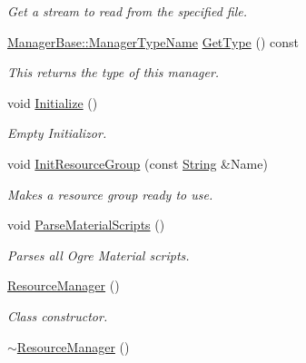 \begin{DoxyCompactItemize}
\begin{DoxyCompactList}\small\item\em Get a stream to read from the specified file. \item\end{DoxyCompactList}\item 
\hyperlink{classphys_1_1ManagerBase_aaa6ccddf23892eaccb898529414f80a5}{ManagerBase::ManagerTypeName} \hyperlink{classphys_1_1ResourceManager_a9e5468e5428f5c108c7b3c01e94eba46}{GetType} () const 
\begin{DoxyCompactList}\small\item\em This returns the type of this manager. \item\end{DoxyCompactList}\item 
void \hyperlink{classphys_1_1ResourceManager_a9be3250f1f1153c9e079f82736eb00a8}{Initialize} ()
\begin{DoxyCompactList}\small\item\em Empty Initializor. \item\end{DoxyCompactList}\item 
void \hyperlink{classphys_1_1ResourceManager_aa2f44129dfc3dc0b0ee332a2bba6078d}{InitResourceGroup} (const \hyperlink{namespacephys_aa03900411993de7fbfec4789bc1d392e}{String} \&Name)
\begin{DoxyCompactList}\small\item\em Makes a resource group ready to use. \item\end{DoxyCompactList}\item 
\hypertarget{classphys_1_1ResourceManager_a348f333ffd9638decd144bf9d65ca05d}{
void \hyperlink{classphys_1_1ResourceManager_a348f333ffd9638decd144bf9d65ca05d}{ParseMaterialScripts} ()}
\label{classphys_1_1ResourceManager_a348f333ffd9638decd144bf9d65ca05d}

\begin{DoxyCompactList}\small\item\em Parses all Ogre Material scripts. \item\end{DoxyCompactList}\item 
\hyperlink{classphys_1_1ResourceManager_af114d84fa357432db4184bfd322495b6}{ResourceManager} ()
\begin{DoxyCompactList}\small\item\em Class constructor. \item\end{DoxyCompactList}\item 
\hyperlink{classphys_1_1ResourceManager_a426d4d684a9ecf98359362243ce01072}{$\sim$ResourceManager} ()
\end{DoxyCompactItemize}
